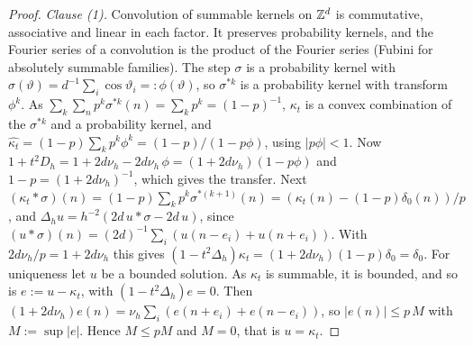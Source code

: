 \begin{proof}
\leanok
\emph{Clause (1).} Convolution of summable kernels on $\mathbb{Z}^d$ is commutative, associative and
linear in each factor. It preserves probability kernels, and the Fourier series of a convolution is
the product of the Fourier series (Fubini for absolutely summable families). The step $\sigma$ is a
probability kernel with $\widehat\sigma(\vartheta) = d^{-1}\sum_i\cos\vartheta_i =: \phi(\vartheta)$, so
$\sigma^{*k}$ is a probability kernel with transform $\phi^k$. As $\sum_k\sum_np^k\sigma^{*k}(n) =
\sum_kp^k = (1-p)^{-1}$, $\kappa_t$ is a convex combination of the $\sigma^{*k}$ and a probability
kernel, and $\widehat{\kappa_t} = (1-p)\sum_kp^k\phi^k = (1-p)/(1-p\phi)$, using $|p\phi| < 1$. Now
$1 + t^2D_h = 1 + 2d\nu_h - 2d\nu_h\,\phi = (1 + 2d\nu_h)(1 - p\phi)$ and
$1 - p = (1+2d\nu_h)^{-1}$, which gives the transfer. Next
$(\kappa_t * \sigma)(n) = (1-p)\sum_kp^k\sigma^{*(k+1)}(n) = (\kappa_t(n) - (1-p)\delta_0(n))/p$,
and $\Delta_hu = h^{-2}(2d\,u * \sigma - 2d\,u)$, since
$(u * \sigma)(n) = (2d)^{-1}\sum_i(u(n-e_i) + u(n+e_i))$. With $2d\nu_h/p = 1 + 2d\nu_h$ this gives
$(1 - t^2\Delta_h)\kappa_t = (1 + 2d\nu_h)(1-p)\delta_0 = \delta_0$.
For uniqueness let $u$ be a bounded solution. As $\kappa_t$ is summable, it is bounded, and so is
$e := u - \kappa_t$, with $(1 - t^2\Delta_h)e = 0$. Then
$(1 + 2d\nu_h)e(n) = \nu_h\sum_i(e(n+e_i) + e(n-e_i))$, so $|e(n)| \le p\,M$ with $M := \sup|e|$.
Hence $M \le pM$ and $M = 0$, that is $u = \kappa_t$.


\end{proof}
